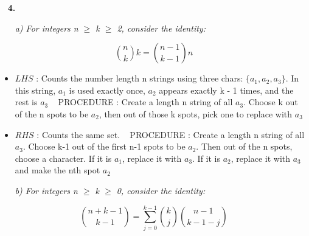 \documentclass[12pt, letterpaper]{article}
\begin{document}
\newpage
\-\ \newline
\bf{ 4. }

\-\ \newline
\-\ \it{ a) For integers n \(\geq\) k \(\geq\) 2, consider the identity: }  

\[ {n \choose k}k = {n - 1 \choose k - 1} n \]

\begin{itemize}
    \item \( LHS \) : Counts the number length n strings using three chars: \(\{ a_1, a_2, a_3 \}\). In this string, \(a_1\) is used exactly once, \(a_2\) appears exactly k - 1 times, and the rest is \(a_3\)
    \-\ \newline
    PROCEDURE : Create a length n string of all \(a_3\). Choose k out of the n spots to be \(a_2\), then out of those k spots, pick one to replace with \(a_3\)

    \item \(RHS\) : Counts the same set.
    \-\ \newline
    PROCEDURE : Create a length n string of all \(a_3\). Choose k-1 out of the first n-1 spots to be \(a_2\). Then out of the n spots, choose a character. If it is \(a_1\), replace it with \(a_3\). If it is \(a_2\), replace it with \(a_3\) and make the nth spot \(a_2\)

\end{itemize} 

\-\ \newline
\-\ \it{ b) For integers n \(\geq\) k \(\geq\) 0, consider the identity: }  

\[ {n + k - 1 \choose k - 1} = \sum_{j=0}^{k-1} {k \choose j} {n - 1 \choose k - 1 - j} \]
\end{document}
